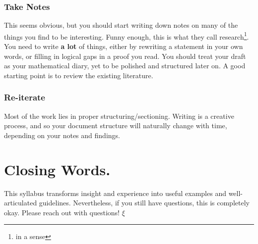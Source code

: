 \documentclass[12pt]{article}
\begin{document}
\subsubsection{Take Notes}

This seems obvious, but you should start writing down notes on many of the things you find to be interesting. Funny enough, this is what they call research\footnote{in a sense}. You need to write \textbf{a lot} of things, either by rewriting a statement in your own words, or filling in logical gaps in a proof you read. You should treat your draft as your mathematical diary, yet to be polished and structured later on. A good starting point is to review the existing literature.

\subsubsection{Re-iterate}
Most of the work lies in proper structuring/sectioning. Writing is a creative process, and so your document structure will naturally change with time, depending on your notes and findings.

\section{Closing Words.} This syllabus transforms insight and experience into useful examples and well-articulated guidelines. Nevertheless, if you still have questions, this is completely okay. Please reach out with questions! \hfill $\boxed \xi$
\end{document}
